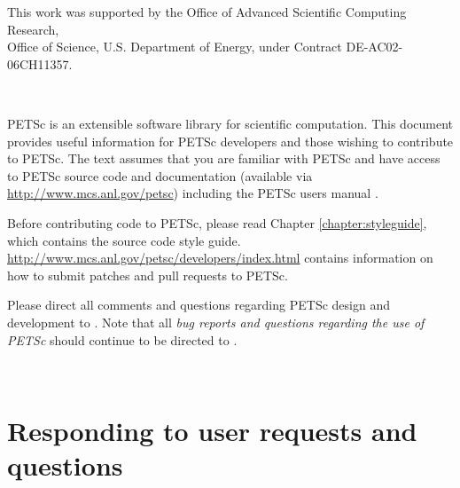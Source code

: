 \vspace*{20pt}
\noindent This work was supported by the Office of Advanced Scientific Computing Research, \\
Office of Science, U.S. Department of Energy, under Contract DE-AC02-06CH11357.


\newpage

\hbox{ }

\vspace{1in}
\date{\today}

\pagestyle{empty}
\newpage

\medskip \medskip

%
%

\medskip \medskip
PETSc is an extensible software library for scientific
computation. This document provides useful information for PETSc
developers and those wishing to contribute to PETSc. The text assumes
that you are familiar with PETSc and have access to PETSc source code
and documentation (available
via \href{http://www.mcs.anl.gov/petsc}{http://www.mcs.anl.gov/petsc}) including the PETSc users manual \cite{petsc-user-ref}.

Before contributing code to PETSc, please read Chapter \ref{chapter:styleguide}, which contains the source code style guide.
\href{http://www.mcs.anl.gov/petsc/developers/index.html}{http://www.mcs.anl.gov/petsc/developers/index.html}
contains information on how to submit patches and pull requests to PETSc.

\vspace{1cm}

Please direct all comments and questions regarding PETSc design and
development to .  Note that all {\em
bug reports and questions regarding the use of PETSc} should continue
to be directed to .

%
%

\newpage
\hbox{ }
\newpage

\tableofcontents

\pagestyle{fancy}
\chapter{Responding to user requests and questions}

